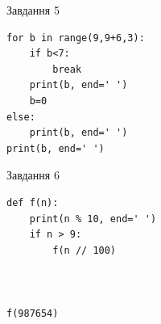 \documentclass[12pt, ukrainian]{article}
\begin{document}
{\vspace{15mm}
\begin{minipage}[t]{9.7cm}                
{\begin{center}Завдання {5}\end{center}}
\begin{verbatim}
for b in range(9,9+6,3):
    if b<7:
        break
    print(b, end=' ')
    b=0
else:
    print(b, end=' ')
print(b, end=' ')
\end{verbatim}     
\end{minipage}
\vline \hspace{8mm}
\begin{minipage}[t]{8.0cm}                
{\begin{center}Завдання {6}\end{center}}
\begin{verbatim}
def f(n):
    print(n % 10, end=' ')
    if n > 9:
        f(n // 100)
    


f(987654)
\end{verbatim}     
\end{minipage}

}
\newpage
\end{document}

